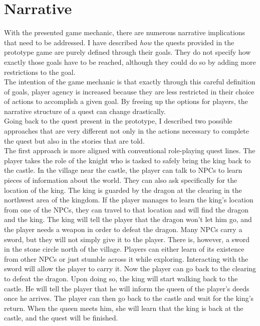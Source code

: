 \section{Narrative}
With the presented game mechanic, there are numerous narrative implications that need to be addressed. I have described \textit{how} the quests provided in the prototype game are purely defined through their goals. They do not specify how exactly those goals have to be reached, although they could do so by adding more restrictions to the goal.\\
The intention of the game mechanic is that exactly through this careful definition of goals, player agency is increased because they are less restricted in their choice of actions to accomplish a given goal. By freeing up the options for players, the narrative structure of a quest can change drastically.\\
Going back to the quest present in the prototype, I described two possible approaches that are very different not only in the actions necessary to complete the quest but also in the stories that are told.\\
The first approach is more aligned with conventional role-playing quest lines. The player takes the role of the knight who is tasked to safely bring the king back to the castle. In the village near the castle, the player can talk to NPCs to learn pieces of information about the world. They can also ask specifically for the location of the king. The king is guarded by the dragon at the clearing in the northwest area of the kingdom. If the player manages to learn the king’s location from one of the NPCs, they can travel to that location and will find the dragon and the king. The king will tell the player that the dragon won’t let him go, and the player needs a weapon in order to defeat the dragon. Many NPCs carry a sword, but they will not simply give it to the player. There is, however, a sword in the stone circle north of the village. Players can either learn of its existence from other NPCs or just stumble across it while exploring. Interacting with the sword will allow the player to carry it. Now the player can go back to the clearing to defeat the dragon. Upon doing so, the king will start walking back to the castle. He will tell the player that he will inform the queen of the player’s deeds once he arrives. The player can then go back to the castle and wait for the king's return. When the queen meets him, she will learn that the king is back at the castle, and the quest will be finished.\\

